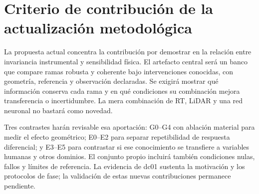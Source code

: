 \section{Criterio de contribución de la actualización metodológica}

La propuesta actual concentra la contribución por demostrar en la relación entre
invariancia instrumental y sensibilidad física. El artefacto central será un banco
que compare ramas robusta y coherente bajo intervenciones conocidas, con geometría,
referencia y observación declaradas. Se exigirá mostrar qué información conserva cada
rama y en qué condiciones su combinación mejora transferencia o incertidumbre.
La mera combinación de RT, LiDAR y una red neuronal no bastará como novedad.

Tres contrastes harán revisable esa aportación: G0--G4 con ablación material para medir
el efecto geométrico; E0--E2 para separar repetibilidad de respuesta diferencial; y
E3--E5 para contrastar si ese conocimiento se transfiere a variables humanas y otros
dominios. El conjunto propio incluirá también condiciones nulas, fallos y límites
de referencia. La evidencia de dc01 sustenta la motivación y los protocolos de fase;
la validación de estas nuevas contribuciones permanece pendiente.
